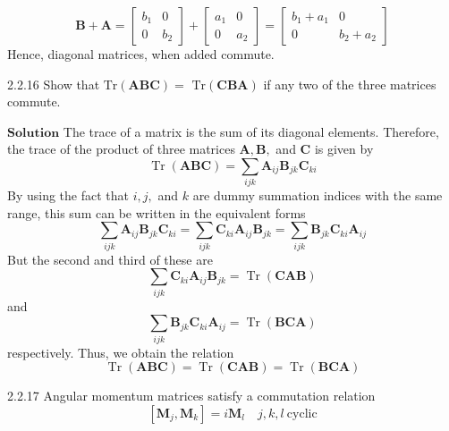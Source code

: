 \documentclass{article}
\begin{document}
\begin{flushleft}
$$\mathbf{B}+\mathbf{A}=\left[\begin{array}{ll}{b_{1}} & {0} \\ {0} & {b_{2}}\end{array}\right]+\left[\begin{array}{ll}{a_{1}} & {0} \\ {0} & {a_{2}}\end{array}\right]=\left[\begin{array}{cc}{b_{1}+a_{1}} & {0} \\ {0} & {b_{2}+a_{2}}\end{array}\right]$$
Hence, diagonal matrices, when added commute.

\newpage


\begin{mybox}{2.2.16}
Show that $\text{Tr}(\mathbf{ABC})=$ $\text{Tr}(\mathbf{CBA})$ if any two of the three matrices commute.
\end{mybox}



$\boxed{\textbf{Solution}}$  The trace of a matrix is the sum of its diagonal elements. Therefore, the trace of the product of three matrices $\mathbf{A}, \mathbf{B},$ and $\mathbf{C}$ is
given by
$$
\operatorname{Tr}(\mathbf{A} \mathbf{B} \mathbf{C})=\sum_{i j k} \mathbf{A}_{i j} \mathbf{B}_{j k} \mathbf{C}_{k i}
$$
By using the fact that $i, j,$ and $k$ are dummy summation indices
with the same range, this sum can be written in the equivalent
forms
$$
\sum_{i j k} \mathbf{A}_{i j} \mathbf{B}_{j k} \mathbf{C}_{k i}=\sum_{i j k} \mathbf{C}_{k i} \mathbf{A}_{i j} \mathbf{B}_{j k}=\sum_{i j k} \mathbf{B}_{j k} \mathbf{C}_{k i} \mathbf{A}_{i j}
$$
But the second and third of these are
$$
\sum_{i j k} \mathbf{C}_{k i} \mathbf{A}_{i j} \mathbf{B}_{j k}=\operatorname{Tr}(\mathbf{C} \mathbf{A} \mathbf{B})
$$
and
$$
\sum_{i j k} \mathbf{B}_{j k} \mathbf{C}_{k i} \mathbf{A}_{i j}=\operatorname{Tr}(\mathbf{B} \mathbf{C} \mathbf{A})
$$
respectively. Thus, we obtain the relation
$$
\operatorname{Tr}(\mathbf{A} \mathbf{B} \mathbf{C})=\operatorname{Tr}(\mathbf{C} \mathbf{A} \mathbf{B})=\operatorname{Tr}(\mathbf{B} \mathbf{C} \mathbf{A})
$$


\newpage

\begin{mybox}{2.2.17}
Angular momentum matrices satisfy a commutation relation
$$[\mathbf{M}_j,\mathbf{M}_k]=i\mathbf{M}_l \quad j,k,l \ \text{cyclic}$$
\end{mybox}




\end{flushleft}
\end{document}
